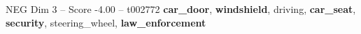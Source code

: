 \begin{textsample}{NEG Dim 3 – Score -4.00 – t002772}  \label{ex:f3_neg_033}
\textbf{car\_door}, \textbf{windshield}, driving, \textbf{car\_seat}, \textbf{security}, steering\_wheel, \textbf{law\_enforcement}

\end{textsample}
